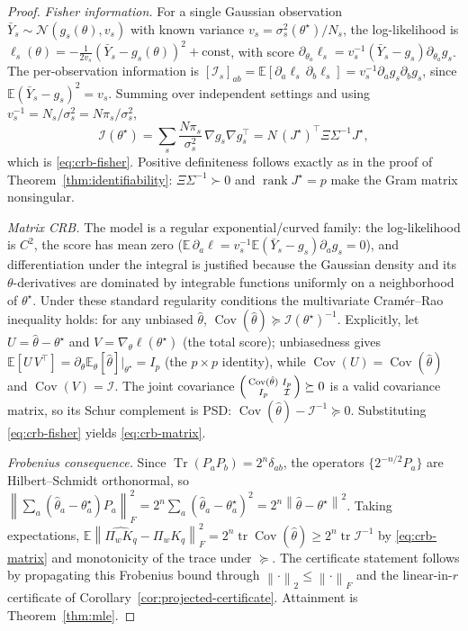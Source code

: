 \documentclass[aps,prxquantum,reprint,superscriptaddress,nofootinbib,amsmath,amssymb]{revtex4-2}
\newcommand{\norm}[1]{\left\lVert #1 \right\rVert}
\newcommand{\Tr}{\operatorname{Tr}}
\begin{document}
\begin{proof}
\emph{Fisher information.} For a single Gaussian observation $\bar Y_s\sim\mathcal{N}(g_s(\theta),v_s)$ with known variance $v_s=\sigma_s^2(\theta^\star)/N_s$, the log-likelihood is $\ell_s(\theta)=-\tfrac1{2v_s}(\bar Y_s-g_s(\theta))^2+\text{const}$, with score $\partial_{\theta_a}\ell_s=v_s^{-1}(\bar Y_s-g_s)\partial_{\theta_a}g_s$. The per-observation information is $[\mathcal{I}_s]_{ab}=\mathbb{E}[\partial_a\ell_s\,\partial_b\ell_s]=v_s^{-1}\partial_ag_s\partial_bg_s$, since $\mathbb{E}(\bar Y_s-g_s)^2=v_s$. Summing over independent settings and using $v_s^{-1}=N_s/\sigma_s^2=N\pi_s/\sigma_s^2$,
\begin{equation*}
    \mathcal{I}(\theta^\star)=\sum_s\frac{N\pi_s}{\sigma_s^2}\,\nabla g_s\nabla g_s^\top=N\,(J^\star)^\top\Xi\Sigma^{-1}J^\star,
\end{equation*}
which is \eqref{eq:crb-fisher}. Positive definiteness follows exactly as in the proof of Theorem~\ref{thm:identifiability}: $\Xi\Sigma^{-1}\succ0$ and $\operatorname{rank}J^\star=p$ make the Gram matrix nonsingular.

\emph{Matrix CRB.} The model is a regular exponential/curved family: the log-likelihood is $C^2$, the score has mean zero ($\mathbb{E}\,\partial_a\ell=v_s^{-1}\mathbb{E}(\bar Y_s-g_s)\partial_ag_s=0$), and differentiation under the integral is justified because the Gaussian density and its $\theta$-derivatives are dominated by integrable functions uniformly on a neighborhood of $\theta^\star$. Under these standard regularity conditions the multivariate Cram\'er--Rao inequality holds: for any unbiased $\hat\theta$, $\operatorname{Cov}(\hat\theta)\succeq\mathcal{I}(\theta^\star)^{-1}$. Explicitly, let $U=\hat\theta-\theta^\star$ and $V=\nabla_\theta\ell(\theta^\star)$ (the total score); unbiasedness gives $\mathbb{E}[U\,V^\top]=\partial_\theta\mathbb{E}_\theta[\hat\theta]\big|_{\theta^\star}=I_p$ (the $p\times p$ identity), while $\operatorname{Cov}(U)=\operatorname{Cov}(\hat\theta)$ and $\operatorname{Cov}(V)=\mathcal{I}$. The joint covariance $\begin{psmallmatrix}\operatorname{Cov}(\hat\theta)&I_p\\ I_p&\mathcal{I}\end{psmallmatrix}\succeq0$ is a valid covariance matrix, so its Schur complement is PSD: $\operatorname{Cov}(\hat\theta)-\mathcal{I}^{-1}\succeq0$. Substituting \eqref{eq:crb-fisher} yields \eqref{eq:crb-matrix}.

\emph{Frobenius consequence.} Since $\Tr(P_aP_b)=2^n\delta_{ab}$, the operators $\{2^{-n/2}P_a\}$ are Hilbert--Schmidt orthonormal, so $\norm{\sum_a(\hat\theta_a-\theta_a^\star)P_a}_F^2=2^n\sum_a(\hat\theta_a-\theta_a^\star)^2=2^n\norm{\hat\theta-\theta^\star}^2$. Taking expectations, $\mathbb{E}\norm{\widehat{\Pi_wK_q}-\Pi_wK_q}_F^2=2^n\operatorname{tr}\operatorname{Cov}(\hat\theta)\geq2^n\operatorname{tr}\mathcal{I}^{-1}$ by \eqref{eq:crb-matrix} and monotonicity of the trace under $\succeq$. The certificate statement follows by propagating this Frobenius bound through $\norm{\cdot}_2\leq\norm{\cdot}_F$ and the linear-in-$r$ certificate of Corollary~\ref{cor:projected-certificate}. Attainment is Theorem~\ref{thm:mle}.
\end{proof}
\end{document}
